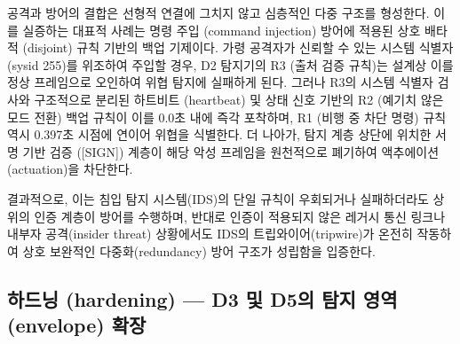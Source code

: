 
공격과 방어의 결합은 선형적 연결에 그치지 않고 심층적인 다중 구조를 형성한다. 이를 실증하는 대표적 사례는 명령 주입 (command injection) 방어에 적용된 상호 배타적 (disjoint) 규칙 기반의 백업 기제이다. 가령 공격자가 신뢰할 수 있는 시스템 식별자 (sysid 255)를 위조하여 주입할 경우, D2 탐지기의 R3 (출처 검증 규칙)는 설계상 이를 정상 프레임으로 오인하여 위협 탐지에 실패하게 된다.
그러나 R3의 시스템 식별자 검사와 구조적으로 분리된 하트비트 (heartbeat) 및 상태 신호 기반의 R2 (예기치 않은 모드 전환) 백업 규칙이 이를 0.0초 내에 즉각 포착하며, R1 (비행 중 차단 명령) 규칙 역시 0.397초 시점에 연이어 위협을 식별한다. 더 나아가, 탐지 계층 상단에 위치한 서명 기반 검증 ([SIGN]) 계층이 해당 악성 프레임을 원천적으로 폐기하여 액추에이션 (actuation)을 차단한다.

결과적으로, 이는 침입 탐지 시스템(IDS)의 단일 규칙이 우회되거나 실패하더라도 상위의 인증 계층이 방어를 수행하며, 반대로 인증이 적용되지 않은 레거시 통신 링크나 내부자 공격(insider threat) 상황에서도 IDS의 트립와이어(tripwire)가 온전히 작동하여 상호 보완적인 다중화(redundancy) 방어 구조가 성립함을 입증한다.

\subsection{하드닝 (hardening) --- D3 및 D5의 탐지 영역 (envelope) 확장}

